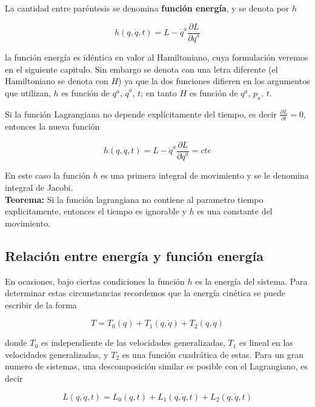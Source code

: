 \documentclass[12pt]{report}
\begin{document}
La cantidad entre paréntesis se denomina \textbf{función energía}, y se denota por $h$

\begin{equation}
h(q,\dot{q},t)= L - \dot{q}^a \frac{\partial L}{\partial \dot{q}^a}
\end{equation}

la función energía es idéntica en valor al Hamiltoniano, cuya formulación veremos en el siguiente capitulo. Sin embargo se denota con una letra diferente (el Hamiltoniano se denota con $H$) ya que la dos funciones difieren en los argumentos que utilizan, $h$ es función de $q^a$, $\dot{q}^a$, $t$; en tanto $H$ es función de $q^a$, $p_a$, $t$.


Si la función Lagrangiana no depende explícitamente del tiempo, es decir $\displaystyle\frac{\partial L}{\partial t}=0$, entonces la nueva función

\begin{equation}
h(q,\dot{q},t)= L - \dot{q}^a \frac{\partial L}{\partial \dot{q}^a}=cte
\end{equation}

En este caso la función $h$ es una primera integral de movimiento y se le denomina integral de Jacobi. \\ 

\textbf{Teorema:} Si la función lagrangiana no contiene al parametro tiempo explicitamente, entonces el tiempo es ignorable y $h$ es una constante del movimiento. 

\subsection{Relación entre energía y función energía }

En ocasiones, bajo ciertas condiciones la función $h$ es la energía del sistema. Para determinar estas circunstancias recordemos que la energía cinética se puede escribir de la forma

\begin{equation}
T=T_0(q) + T_1(q,\dot{q}) + T_2(q,\dot{q})
\end{equation}

donde $T_0$ es independiente de las velocidades generalizadas, $T_1$ es lineal en las velocidades generalizadas, y $T_2$ es una función cuadrática de estas. Para un gran numero de sistemas, una descomposición similar es posible con el Lagrangiano, es decir



\begin{equation}
L\left( q,\dot{q},t \right) =L_0(q,t) + L_1(q,\dot{q},t) + L_2(q,\dot{q},t)
\end{equation}
\end{document}
